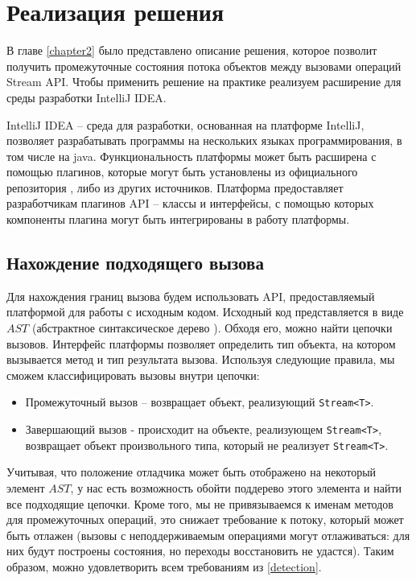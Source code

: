 \section{Реализация решения}\label{chapter3}

В главе \ref{chapter2} было представлено описание решения, которое позволит получить промежуточные состояния потока объектов между вызовами операций Stream API. Чтобы применить решение на практике реализуем расширение для среды разработки IntelliJ IDEA. 

IntelliJ IDEA -- среда для разработки, основанная на платформе IntelliJ, позволяет разрабатывать программы на нескольких языках программирования, в том числе на java. Функциональность платформы может быть расширена с помощью плагинов, которые могут быть установлены из официального репозитория \cite{jb:plugins}, либо из других источников. Платформа предоставляет разработчикам плагинов API -- классы и интерфейсы, с помощью которых компоненты плагина могут быть интегрированы в работу платформы.
\subsection{Нахождение подходящего вызова}

Для нахождения границ вызова будем использовать API, предоставляемый платформой для работы с исходным кодом. Исходный код представляется в виде $AST$ (абстрактное синтаксическое дерево \cite{wiki:ast}). Обходя его, можно найти цепочки вызовов. Интерфейс платформы позволяет определить тип объекта, на котором вызывается метод и тип результата вызова. Используя следующие правила, мы сможем классифицировать вызовы внутри цепочки:
\begin{itemize}
	\item Промежуточный вызов -- возвращает объект, реализующий \texttt{Stream<T>}.
	\item Завершающий вызов - происходит на объекте, реализующем \texttt{Stream<T>}, возвращает объект произвольного типа, который не реализует \texttt{Stream<T>}. 
\end{itemize}

Учитывая, что положение отладчика может быть отображено на некоторый элемент $AST$, у нас есть возможность обойти поддерево этого элемента и найти все подходящие цепочки. Кроме того, мы не привязываемся к именам методов для промежуточных операций, это снижает требование к потоку, который может быть отлажен (вызовы с неподдерживаемым операциями могут отлаживаться: для них будут построены состояния, но переходы восстановить не удастся). Таким образом, можно удовлетворить всем требованиям из \ref{detection}.

